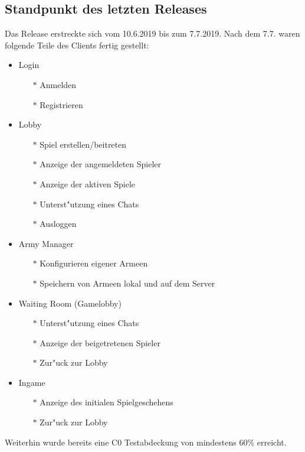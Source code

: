 \documentclass[12pt, titlepage]{scrartcl}
\newcommand{\RN}[1]{%
	\textup{\uppercase\expandafter{\romannumeral#1}}%
}
\begin{document}
        \subsection{Standpunkt des letzten Releases}
            Das Release \RN{2} erstreckte sich vom 10.6.2019 bis zum 7.7.2019. Nach dem 7.7. waren folgende Teile des Clients fertig gestellt:
            \begin{itemize}
                \item Login
                \begin{itemize}
                    \item[$\ast$] Anmelden
                    \item[$\ast$] Registrieren
                \end{itemize}
                \item Lobby
                \begin{itemize}
                    \item[$\ast$] Spiel erstellen/beitreten
                    \item[$\ast$] Anzeige der angemeldeten Spieler 
                    \item[$\ast$] Anzeige der aktiven Spiele
                    \item[$\ast$] Unterst"utzung eines Chats
                    \item[$\ast$] Ausloggen
                \end{itemize}
                \item Army Manager
                \begin{itemize}
                    \item[$\ast$] Konfigurieren eigener Armeen
                    \item[$\ast$] Speichern von Armeen lokal und auf dem Server
                \end{itemize}
                \item Waiting Room (Gamelobby)
                \begin{itemize}
                    \item[$\ast$] Unterst"utzung eines Chats
                    \item[$\ast$] Anzeige der beigetretenen Spieler 
                    \item[$\ast$] Zur"uck zur Lobby
                \end{itemize}
                \item Ingame
                \begin{itemize}
                    \item[$\ast$] Anzeige des initialen Spielgeschehens
                    \item[$\ast$] Zur"uck zur Lobby
                \end{itemize}
            \end{itemize}
            Weiterhin wurde bereits eine C0 Testabdeckung von mindestens 60\% erreicht.
\end{document}
